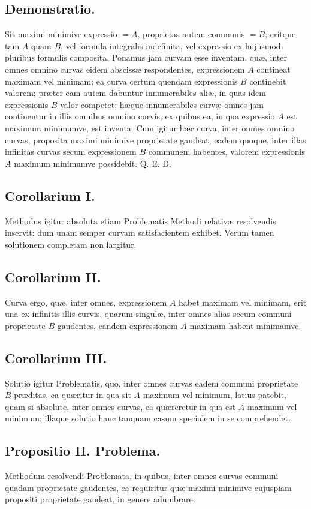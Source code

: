 \subsection*{Demonstratio.}
Sit maximi minimive expressio $=A$, proprietas autem communis $=B$; eritque tam $A$ quam $B$, vel formula integralis indefinita, vel expressio ex hujusmodi pluribus formulis composita. Ponamus jam curvam esse inventam, quæ, inter omnes omnino curvas eidem abscissæ respondentes, expressionem $A$ contineat maximam vel minimam; ea curva certum quendam expressionis $B$ continebit valorem; præter eam autem dabuntur innumerabiles aliæ, in quas idem expressionis $B$ valor competet; hæque innumerabiles curvæ omnes jam continentur in illis omnibus omnino curvis, ex quibus ea, in qua expressio $A$ est maximum minimumve, est inventa. Cum igitur hæc curva, inter omnes omnino curvas, proposita maximi minimive proprietate gaudeat; eadem quoque, inter illas infinitas curvas secum expressionem $B$ communem habentes, valorem expressionis $A$ maximum minimumve possidebit. Q. E. D.

\subsection*{Corollarium I.}
Methodus igitur absoluta etiam Problematis Methodi relativæ resolvendis inservit: dum unam semper curvam satisfacientem exhibet. Verum tamen solutionem completam non largitur.

\subsection*{Corollarium II.}
Curva ergo, quæ, inter omnes, expressionem $A$ habet maximam vel minimam, erit una ex infinitis illis curvis, quarum singulæ, inter omnes alias secum communi proprietate $B$ gaudentes, eandem expressionem $A$ maximam habent minimamve.

\subsection*{Corollarium III.}
Solutio igitur Problematis, quo, inter omnes curvas eadem communi proprietate $B$ præditas, ea quæritur in qua sit $A$ maximum vel minimum, latius patebit, quam si absolute, inter omnes curvas, ea quæreretur in qua est $A$ maximum vel minimum; illaque solutio hanc tanquam casum specialem in se comprehendet.

\subsection*{Propositio II. Problema.}
Methodum resolvendi Problemata, in quibus, inter omnes curvas communi quadam proprietate gaudentes, ea requiritur quæ maximi minimive cujuspiam propositi proprietate gaudeat, in genere adumbrare.

